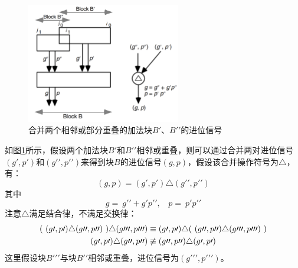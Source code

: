 \begin{figure}[!b]
    \centering
    \includegraphics[width=0.6\textwidth]{figs/EM-PPA_BB.pdf}
    \caption{合并两个相邻或部分重叠的加法块$B \prime$、$B \prime \prime$的进位信号}
\label{EM:Fig:PPA_BB}
\end{figure}
如图\ref{EM:Fig:PPA_BB}所示，假设两个加法块$B \prime$和$B \prime \prime$相邻或重叠，则可以通过合并两对进位信号$(g \prime, p \prime)$和$(g \prime \prime, p \prime \prime)$来得到块$B$的进位信号$(g,p)$，假设该合并操作符号为$\triangle$，有：
\begin{equation}
    (g,p) = (g \prime, p \prime) \triangle (g \prime \prime, p \prime \prime)
\end{equation}
其中
\begin{equation}
    g = \ g \prime \prime + g \prime p \prime\prime , \ \ \ \ p = \ p \prime p \prime \prime
\end{equation}
注意$\triangle$满足结合律，不满足交换律：
\begin{align}
    ( \ (g \prime, p \prime) \triangle (g \prime \prime, p \prime \prime) \ ) \triangle (g \prime \prime \prime, p \prime \prime \prime) & \equiv (g \prime, p \prime) \triangle ( \ (g \prime \prime, p \prime \prime) \triangle (g \prime \prime \prime, p \prime \prime \prime) \ ) \notag \\
    (g \prime, p \prime) \triangle (g \prime \prime, p \prime \prime) & \not\equiv (g \prime \prime, p \prime \prime) \triangle (g \prime, p \prime)
\end{align}
这里假设块$B \prime \prime \prime$与块$B \prime \prime$相邻或重叠，进位信号为$(g \prime \prime \prime, p \prime \prime \prime)$。

